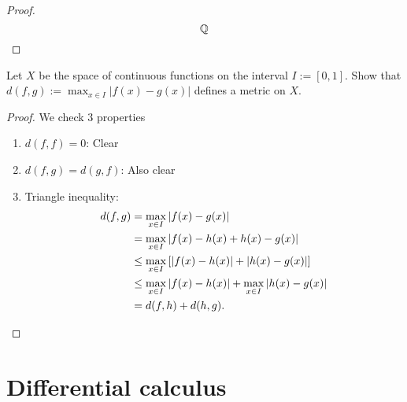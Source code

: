 \begin{proof}
	\[\mathbb{Q}\qedhere\]
\end{proof}
\begin{Problem}
	Let $X$ be the space of continuous functions on the interval $I := [0,1]$. Show that $d(f,g) := \max_{x \in I} |f(x) - g(x)|$ defines a metric on $X$.
\end{Problem}
\begin{proof}
	We check 3 properties
	\begin{enumerate}
		\item $d(f,f) = 0$: Clear
		\item $d(f,g) = d(g,f)$: Also clear
		\item Triangle inequality:
		\begin{align*}
			d(f,g) &= \max_{x\in I}|f(x) - g(x)|\\
			&= \max_{x\in I}|f(x) - h(x) + h(x) - g(x)|\\
			&\le \max_{x\in I}\left[ |f(x) - h(x)| + |h(x) - g(x)|\right]\\
			&\le \max_{x\in I}|f(x) - h(x)| + \max_{x\in I}|h(x) - g(x)|\\
			&=d(f,h) + d(h,g).\qedhere
		\end{align*}
	\end{enumerate}
\end{proof}
\section*{Differential calculus}

